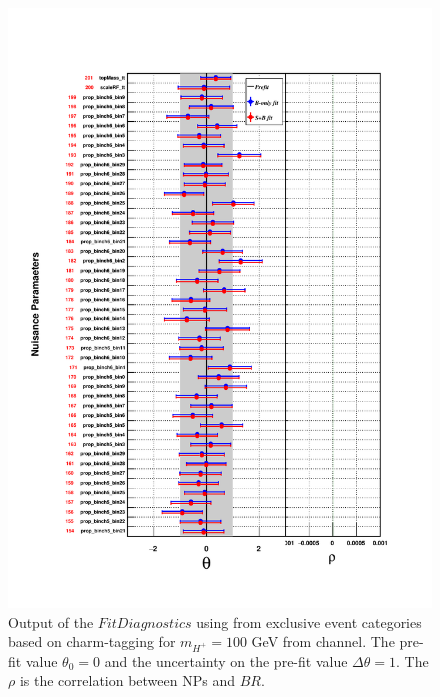 \begin{figure}
\begin{center}
\includegraphics[width=1.0\textwidth]{Image/MLFit/FitDiag/fitDiag4.pdf}
 \caption{Output of the $FitDiagnostics$ using \mjj from
     exclusive event categories based on charm-tagging for $m_{H^+} = 100$
     GeV from \ljets channel. The pre-fit value $\theta_0 = 0$ and the uncertainty on the
     pre-fit value $\Delta\theta = 1$. The $\rho$ is the correlation between NPs and $BR$.}
\label{fig:fitDiag4}
\end{center}
\end{figure}

